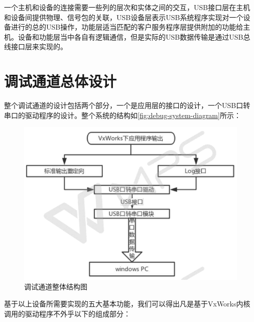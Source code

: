 	一个主机和设备的连接需要一些列的层次和实体之间的交互，USB接口层在主机和设备间提供物理、信号包的关联，USB设备层表示USB系统程序实现对一个设备进行的总的USB操作，功能层适当匹配的客户服务程序层提供附加的功能给主机。设备和功能层当中各自有逻辑通信，但是实际的USB数据传输是通过USB总线接口层来实现的\cite{USB开发手册}\cite{圈圈教你玩USB}。

	
\section{调试通道总体设计}

	整个调试通道的设计包括两个部分，一个是应用层的接口的设计，一个USB口转串口的驱动程序的设计。整个系统的结构如\autoref{fig:debug-system-diagram}所示：
\begin{figure}[!h]
\centering
\includegraphics[width=.7\textwidth]{./graphics/debug-system-diagram.pdf}
\caption{调试通道整体结构图}\label{fig:debug-system-diagram}
\end{figure}































基于以上设备所需要实现的五大基本功能，我们可以得出凡是基于VxWorks内核调用的驱动程序不外乎以下的组成部分：

